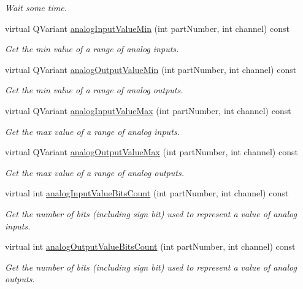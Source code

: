 \begin{DoxyCompactItemize}
\begin{DoxyCompactList}\small\item\em Wait some time. \end{DoxyCompactList}\item 
virtual QVariant \hyperlink{classmdt_device_modbus_wago_module_a6b5af2c05f5428d0866a2f5301c07055}{analogInputValueMin} (int partNumber, int channel) const 
\begin{DoxyCompactList}\small\item\em Get the min value of a range of analog inputs. \end{DoxyCompactList}\item 
virtual QVariant \hyperlink{classmdt_device_modbus_wago_module_a306b6b993c58f9c02defda97c3300e21}{analogOutputValueMin} (int partNumber, int channel) const 
\begin{DoxyCompactList}\small\item\em Get the min value of a range of analog outputs. \end{DoxyCompactList}\item 
virtual QVariant \hyperlink{classmdt_device_modbus_wago_module_ae4f0670b0657ace4af5bdc7eb80d7f71}{analogInputValueMax} (int partNumber, int channel) const 
\begin{DoxyCompactList}\small\item\em Get the max value of a range of analog inputs. \end{DoxyCompactList}\item 
virtual QVariant \hyperlink{classmdt_device_modbus_wago_module_a736fe244944e4180d4fd9d35d5ad08d0}{analogOutputValueMax} (int partNumber, int channel) const 
\begin{DoxyCompactList}\small\item\em Get the max value of a range of analog outputs. \end{DoxyCompactList}\item 
virtual int \hyperlink{classmdt_device_modbus_wago_module_aec715d2707c556ead4690d82ee9c8307}{analogInputValueBitsCount} (int partNumber, int channel) const 
\begin{DoxyCompactList}\small\item\em Get the number of bits (including sign bit) used to represent a value of analog inputs. \end{DoxyCompactList}\item 
virtual int \hyperlink{classmdt_device_modbus_wago_module_a4c24b14835ab4f57caf342513bc88a02}{analogOutputValueBitsCount} (int partNumber, int channel) const 
\begin{DoxyCompactList}\small\item\em Get the number of bits (including sign bit) used to represent a value of analog outputs. \end{DoxyCompactList}\item 

\end{DoxyCompactItemize}
